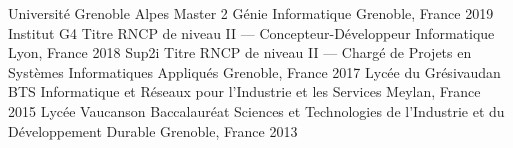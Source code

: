 

\begin{cventries}

  \cventryy
    {Université Grenoble Alpes} %
    {Master 2 Génie Informatique} %
    {Grenoble, France} %
    {2019} %
  \cventryy
    {Institut G4} %
    {Titre RNCP de niveau II — Concepteur-Développeur Informatique} %
    {Lyon, France} %
    {2018} %
  \cventryy
    {Sup2i} %
    {Titre RNCP de niveau II — Chargé de Projets en Systèmes Informatiques Appliqués} %
    {Grenoble, France} %
    {2017} %
  \cventryy
    {Lycée du Grésivaudan} %
    {BTS Informatique et Réseaux pour l'Industrie et les Services} %
    {Meylan, France} %
    {2015} %
  \cventryy
    {Lycée Vaucanson} %
    {Baccalauréat Sciences et Technologies de l'Industrie et du Développement Durable} %
    {Grenoble, France} %
    {2013} %
\end{cventries}
